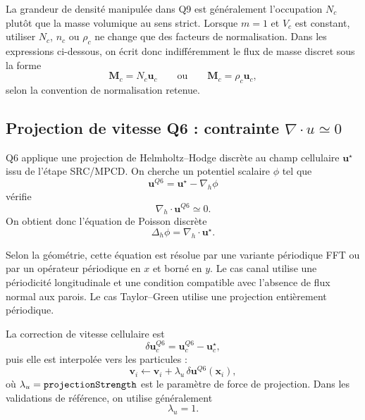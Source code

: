 \documentclass[11pt,a4paper]{article}
\begin{document}
La grandeur de densité manipulée dans Q9 est généralement l'occupation $N_c$ plutôt que la masse volumique au sens strict. Lorsque $m=1$ et $V_c$ est constant, utiliser $N_c$, $n_c$ ou $\rho_c$ ne change que des facteurs de normalisation. Dans les expressions ci-dessous, on écrit donc indifféremment le flux de masse discret sous la forme
\begin{equation}
  \bm{M}_c = N_c\bm{u}_c
  \qquad \text{ou} \qquad
  \bm{M}_c = \rho_c\bm{u}_c,
\end{equation}
selon la convention de normalisation retenue.

\subsection{Projection de vitesse Q6 : contrainte $\nabla\cdot u\simeq 0$}

Q6 applique une projection de Helmholtz--Hodge discrète au champ cellulaire $\bm{u}^{\star}$ issu de l'étape SRC/MPCD. On cherche un potentiel scalaire $\phi$ tel que
\begin{equation}
  \bm{u}^{Q6} = \bm{u}^{\star} - \nabla_h \phi
\end{equation}
vérifie
\begin{equation}
  \nabla_h\cdot \bm{u}^{Q6} \simeq 0.
\end{equation}
On obtient donc l'équation de Poisson discrète
\begin{equation}
  \Delta_h \phi = \nabla_h\cdot \bm{u}^{\star}.
\end{equation}

Selon la géométrie, cette équation est résolue par une variante périodique FFT ou par un opérateur périodique en $x$ et borné en $y$. Le cas canal utilise une périodicité longitudinale et une condition compatible avec l'absence de flux normal aux parois. Le cas Taylor--Green utilise une projection entièrement périodique.

La correction de vitesse cellulaire est
\begin{equation}
  \delta\bm{u}_c^{Q6}=\bm{u}_c^{Q6}-\bm{u}_c^{\star},
\end{equation}
puis elle est interpolée vers les particules :
\begin{equation}
  \bm{v}_i \leftarrow \bm{v}_i + \lambda_u\,\delta\bm{u}^{Q6}(\bm{x}_i),
\end{equation}
où $\lambda_u=\verb|projectionStrength|$ est le paramètre de force de projection. Dans les validations de référence, on utilise généralement
\begin{equation}
  \lambda_u=1.
\end{equation}
\end{document}
